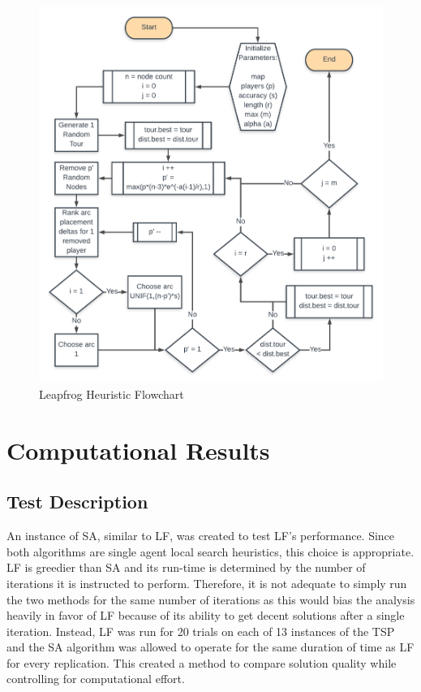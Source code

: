\documentclass[12pt,letterpaper,oneside]{book}
\begin{document}
\begin{figure}[h]
	\centering
	\includegraphics[width=1\linewidth]{flow.png}
	\caption{Leapfrog Heuristic Flowchart}
	\label{flow}
\end{figure}


\chapter{Computational Results}
\section{Test Description}
An instance of SA, similar to LF, was created to test LF's performance. Since both algorithms are single agent local search heuristics, this choice is appropriate. LF is greedier than SA and its run-time is determined by the number of iterations it is instructed to perform. Therefore, it is not adequate to simply run the two methods for the same number of iterations as this would bias the analysis heavily in favor of LF because of its ability to get decent solutions after a single iteration. Instead, LF was run for 20 trials on each of 13 instances of the TSP and the SA algorithm was allowed to operate for the same duration of time as LF for every replication. This created a method to compare solution quality while controlling for computational effort.
\end{document}
